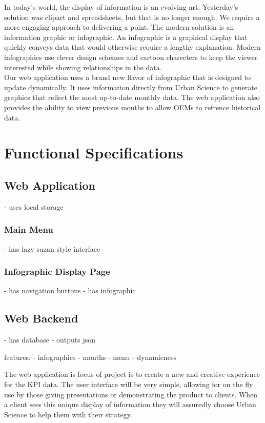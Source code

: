 \documentclass[11pt,a4paper,oneside]{article}
\begin{document}
In today's world, the display of information is an evolving art. Yesterday's solution was clipart and spreadsheets, but that is no longer enough. We require a more engaging approach to delivering a point. The modern solution is an information graphic or infographic. An infographic is a graphical display that quickly conveys data that would otherwise require a lengthy explanation. Modern infographics use clever design schemes and cartoon charecters to keep the viewer interested while showing relationships in the data.\\


Our web application uses a brand new flavor of infographic that is designed to update dynamically. It uses information directly from Urban Science to generate graphics that reflect the most up-to-date monthly data. The web application also provides the ability to view previous months to allow OEMs to refrence historical data.\\

\section{Functional Specifications}

\subsection {Web Application}
 - uses local storage


\subsubsection {Main Menu}
 - has lazy suzan style interface
 - 

\subsubsection {Infographic Display Page}
 - has navigation buttons
 - has infographic


\subsection {Web Backend}
 - has database
 - outputs json



features: 
   - infographics
   - months
   - menu
   - dynamicness


The web application is focus of project is to create a new and creative experience for the KPI data. The user interface will be very simple, allowing for on the fly use by those giving presentations or demonstrating the product to clients. When a client sees this unique display of information they will assuredly choose Urban Science to help them with their strategy.\\
\end{document}
